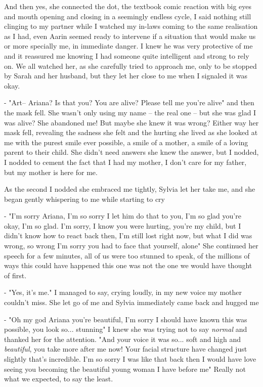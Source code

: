 \documentclass[colorlinks,12pt,a4paper]{book}
\begin{document}
 And then yes, she connected the dot, the textbook comic reaction with big eyes and mouth opening and closing in a seemingly endless cycle, 
 I said nothing still clinging to my partner while I watched my in-laws coming to the same realisation as I had, even Aarin seemed ready to
 intervene if a situation that would make us or more specially me, in immediate danger. I knew he was very protective of me and it reassured 
 me knowing I had someone quite intelligent and strong to rely on. We all watched her, as she carefully tried to approach me, only to be stopped 
 by Sarah and her husband, but they let her close to me when I signaled it was okay.\par 
 \bigskip
 
 - "Art-- Ariana? Is that you? You are alive? Please tell me you're alive" and then the mask fell. She wasn't only using my 
 name -- the real one -- but she was glad I was alive? She abandoned me! But maybe she knew it was wrong? 
 Either way her mask fell, revealing the sadness she felt and the hurting she lived as she looked at me with the purest 
 smile ever possible, a smile of a mother, a smile of a loving parent to their child. She didn't need answers she knew the answer,
 but I nodded, I nodded to cement the fact that I had my mother, I don't care for my father, but my mother is here for me.\par 
 \bigskip
 
 As the second I nodded she embraced me tightly, Sylvia let her take me, and she began gently whispering to me while starting to 
 cry\par 
 - "I'm sorry Ariana, I'm so sorry I let him do that to you, I'm so glad you're okay, I'm so glad. I'm sorry, I know you 
 were hurting, you're my child, but I didn't know how to react back then, I'm still lost right now, but what I did was 
 wrong, so wrong I'm sorry you had to face that yourself, alone" She continued her speech for a few minutes, all of us
 were too stunned to speak, of the millions of ways this could have happened this one was not the one we would have thought 
 of first.\par 
 \bigskip
 
 - "Yes, it's me." I managed to say, crying loudly, in my new voice my mother couldn't miss. She let go of me and Sylvia immediately
 came back and hugged me\par
 \bigskip
 
 - "Oh my god Ariana you're beautiful, I'm sorry I should have known this was possible, you look so... stunning" I knew she was 
 trying not to say \textit{normal} and thanked her for the attention. "And your voice it was so... soft and high and \textit{beautiful},
 you take more after me now! Your facial structure have changed just slightly that's incredible. I'm so sorry I was like that back then 
 I would have love seeing you becoming the beautiful young woman I have before me" Really not what we expected, to say the least.\par 
 \bigskip
 
\end{document}
